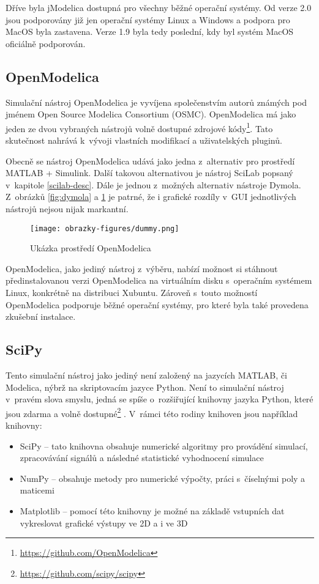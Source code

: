 Dříve byla jModelica dostupná pro všechny běžné operační systémy. Od verze 2.0 jsou podporovány již jen operační systémy Linux a Windows a podpora pro MacOS byla zastavena. Verze 1.9 byla tedy poslední, kdy byl systém MacOS oficiálně podporován.

\subsection{OpenModelica}
\label{openmodelica-desc}
Simulační nástroj OpenModelica je vyvíjena společenstvím autorů známých pod jménem Open Source Modelica Consortium (OSMC). OpenModelica má jako jeden ze dvou vybraných nástrojů volně dostupné zdrojové kódy\footnote{\url{https://github.com/OpenModelica}}. Tato skutečnost nahrává k~vývoji vlastních modifikací a uživatelských pluginů.

Obecně se nástroj OpenModelica udává jako jedna z~alternativ pro prostředí MATLAB + Simulink. Další takovou alternativou je nástroj SciLab popsaný v~kapitole \ref{scilab-desc}. Dále je jednou z~možných alternativ nástroje Dymola. Z~obrázků \ref{fig:dymola} a \ref{fig:jmodelica} je patrné, že i grafické rozdíly v~GUI jednotlivých nástrojů nejsou nijak markantní.

\begin{figure}
    \centering
    \texttt{[image: obrazky-figures/dummy.png]}
    \caption{Ukázka prostředí OpenModelica}
    \label{fig:jmodelica}
\end{figure}

OpenModelica, jako jediný nástroj z~výběru, nabízí možnost si stáhnout předinstalovanou verzi OpenModelica na virtuálním disku s~operačním systémem Linux, konkrétně na distribuci Xubuntu. Zároveň s~touto možností OpenModelica podporuje běžné operační systémy, pro které byla také provedena zkušební instalace.

\subsection{SciPy}
\label{chapter-scipy}
Tento simulační nástroj jako jediný není založený na jazycích MATLAB, či Modelica, nýbrž na skriptovacím jazyce Python. Není to simulační nástroj v~pravém slova smyslu, jedná se spíše o~rozšiřující knihovny jazyka Python, které jsou zdarma a volně dostupné\footnote{\url{https://github.com/scipy/scipy}} \cite{scipy}. V~rámci této rodiny knihoven jsou například knihovny:
\begin{itemize}
    \item SciPy -- tato knihovna obsahuje numerické algoritmy pro provádění simulací, zpracovávání signálů a následné statistické vyhodnocení simulace
    \item NumPy -- obsahuje metody pro numerické výpočty, práci s~číselnými poly a maticemi
    \item Matplotlib -- pomocí této knihovny je možné na základě vstupních dat vykreslovat grafické výstupy ve 2D a i ve 3D
\end{itemize}

